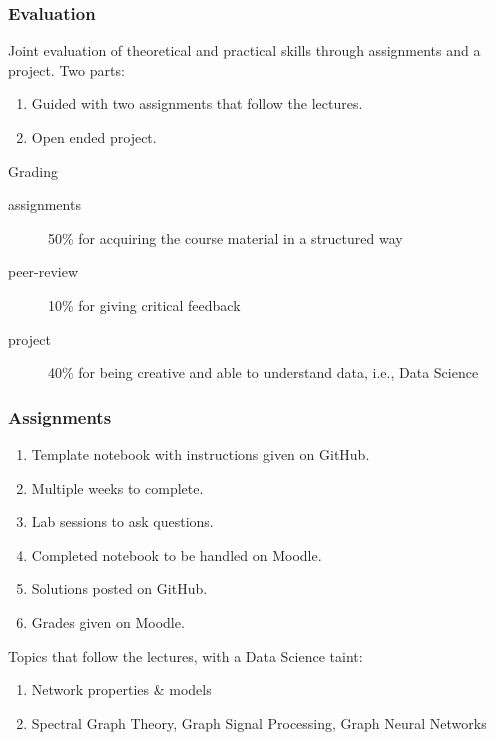 \documentclass[aspectratio=169]{beamer}
\begin{document}

\begin{frame}
	\frametitle{Evaluation}
	Joint evaluation of theoretical and practical skills through assignments and a project.
	\vfill
	Two parts:
	\begin{enumerate}
		\item Guided with two assignments that follow the lectures.
		\item Open ended project.
	\end{enumerate}
	\vfill
	\begin{block}{Grading}
	\begin{description}
		\item[assignments] 50\% for acquiring the course material in a structured way
		\item[peer-review] 10\% for giving critical feedback
		\item[project] 40\% for being creative and able to understand data, i.e., Data Science
	\end{description}
	\end{block}
\end{frame}


\begin{frame}
	\frametitle{Assignments}
	\begin{enumerate}
		\item Template notebook with instructions given on GitHub.
		\item Multiple weeks to complete.
		\item Lab sessions to ask questions.
		\item Completed notebook to be handled on Moodle.
		\item Solutions posted on GitHub.
		\item Grades given on Moodle.
	\end{enumerate}
	\vfill
	Topics that follow the lectures, with a Data Science taint:
	\begin{enumerate}
		\item Network properties \& models
		\item Spectral Graph Theory, Graph Signal Processing, Graph Neural Networks
	\end{enumerate}
\end{frame}

\end{document}
